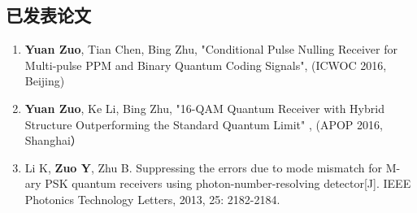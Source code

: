 ﻿\begin{publications}

\section*{已发表论文}

\begin{enumerate}
\item \textbf{Yuan Zuo}, Tian Chen, Bing Zhu, "Conditional Pulse Nulling Receiver for Multi-pulse PPM and Binary Quantum Coding Signals", (ICWOC 2016, Beijing)
\item \textbf{Yuan Zuo}, Ke Li, Bing Zhu, "16-QAM Quantum Receiver with Hybrid Structure Outperforming the Standard Quantum Limit" , (APOP 2016, Shanghai）
\item Li K, \textbf{Zuo Y}, Zhu B. Suppressing the errors due to mode mismatch for M-ary PSK quantum receivers using photon-number-resolving detector[J]. IEEE Photonics Technology Letters, 2013, 25: 2182-2184.
\end{enumerate}



\end{publications}
